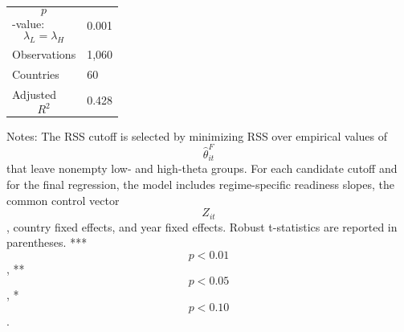 \begin{table}[H]
\begin{threeparttable}
\begin{tabularx}{\textwidth}{lY}
$$p$$-value: $$\lambda_L=\lambda_H$$ & 0.001 \\
Observations & 1,060 \\
Countries & 60 \\
Adjusted $$R^2$$ & 0.428 \\
\bottomrule
\end{tabularx}
\begin{tablenotes}[flushleft]\footnotesize
\item Notes: The RSS cutoff is selected by minimizing RSS over empirical values of $$\widehat{\theta}^{F}_{it}$$ that leave nonempty low- and high-theta groups. For each candidate cutoff and for the final regression, the model includes regime-specific readiness slopes, the common control vector $$Z_{it}$$, country fixed effects, and year fixed effects. Robust t-statistics are reported in parentheses. *** $$p<0.01$$, ** $$p<0.05$$, * $$p<0.10$$.
\end{tablenotes}
\end{threeparttable}
\end{table}
